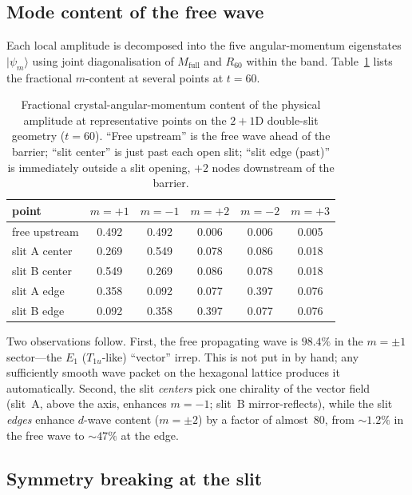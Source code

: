 \documentclass[twocolumn,showpacs,preprintnumbers,amsmath,amssymb]{revtex4-2}
\begin{document}
\subsection{Mode content of the free wave}

Each local amplitude is decomposed into the five angular-momentum
eigenstates $|\psi_{m}\rangle$ using joint diagonalisation of
$M_{\mathrm{full}}$ and $R_{60}$ within the band.
Table~\ref{tab:slit-modes} lists the fractional $m$-content at several
points at $t=60$.

\begin{table}[b]
\caption{Fractional crystal-angular-momentum content of the physical
amplitude at representative points on the $2{+}1$D double-slit geometry
($t=60$).
``Free upstream'' is the free wave ahead of the barrier;
``slit center'' is just past each open slit; ``slit edge (past)'' is
immediately outside a slit opening, $+2$ nodes downstream of the
barrier.}
\label{tab:slit-modes}
\begin{ruledtabular}
\begin{tabular}{lccccc}
point & $m=+1$ & $m=-1$ & $m=+2$ & $m=-2$ & $m=+3$ \\
\hline
free upstream & 0.492 & 0.492 & 0.006 & 0.006 & 0.005 \\
slit A center & 0.269 & 0.549 & 0.078 & 0.086 & 0.018 \\
slit B center & 0.549 & 0.269 & 0.086 & 0.078 & 0.018 \\
slit A edge   & 0.358 & 0.092 & 0.077 & 0.397 & 0.076 \\
slit B edge   & 0.092 & 0.358 & 0.397 & 0.077 & 0.076 \\
\end{tabular}
\end{ruledtabular}
\end{table}

Two observations follow.
First, the free propagating wave is $98.4\%$ in the
$m=\pm 1$ sector---the $E_{1}$ ($T_{1u}$-like) ``vector'' irrep.
This is not put in by hand; any sufficiently smooth wave packet on the
hexagonal lattice produces it automatically.
Second, the slit \emph{centers} pick one chirality of the vector field
(slit~A, above the axis, enhances $m=-1$; slit~B mirror-reflects),
while the slit \emph{edges} enhance $d$-wave content ($m=\pm 2$) by a
factor of almost~$80$, from $\sim\!1.2\%$ in the free wave to
$\sim\!47\%$ at the edge.

\subsection{Symmetry breaking at the slit}
\end{document}
